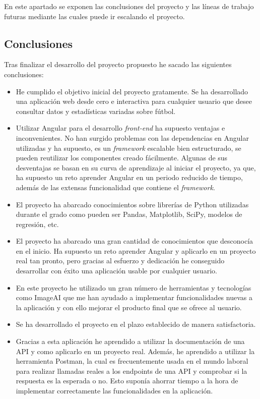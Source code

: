 
En este apartado se exponen las conclusiones del proyecto y las líneas de trabajo futuras mediante las cuales puede ir escalando el proyecto.

\subsection{Conclusiones}

Tras finalizar el desarrollo del proyecto propuesto he sacado las siguientes conclusiones:
\begin{itemize}
    \item He cumplido el objetivo inicial del proyecto gratamente. Se ha desarrollado una aplicación web desde cero e interactiva para cualquier usuario que desee consultar datos y estadísticas variadas sobre fútbol.
    \item Utilizar Angular para el desarrollo \textit{front-end} ha supuesto ventajas e inconvenientes. No han surgido problemas con las dependencias en Angular utilizadas y ha supuesto, es un \textit{framework} escalable bien estructurado, se pueden reutilizar los componentes creado fácilmente. Algunas de sus desventajas se basan en su curva de aprendizaje al iniciar el proyecto, ya que, ha supuesto un reto aprender Angular en un periodo reducido de tiempo, además de las extensas funcionalidad que contiene el \textit{framework}.
    \item El proyecto ha abarcado conocimientos sobre librerías de Python utilizadas durante el grado como pueden ser Pandas, Matplotlib, SciPy, modelos de regresión, etc.
    \item El proyecto ha abarcado una gran cantidad de conocimientos que desconocía en el inicio. Ha supuesto un reto aprender Angular y aplicarlo en un proyecto real tan pronto, pero gracias al esfuerzo y dedicación he conseguido desarrollar con éxito una aplicación usable por cualquier usuario.
    \item En este proyecto he utilizado un gran número de herramientas y tecnologías como ImageAI que me han ayudado a implementar funcionalidades nuevas a la aplicación y con ello mejorar el producto final que se ofrece al usuario. 
    \item Se ha desarrollado el proyecto en el plazo establecido de manera satisfactoria.
    \item Gracias a esta aplicación he aprendido a utilizar la documentación de una API y como aplicarlo en un proyecto real. Además, he aprendido a utilizar la herramienta Postman, la cual es frecuentemente usada en el mundo laboral para realizar llamadas reales a los endpoints de una API y comprobar si la respuesta es la esperada o no. Esto suponía ahorrar tiempo a la hora de implementar correctamente las funcionalidades en la aplicación.
\end{itemize}

